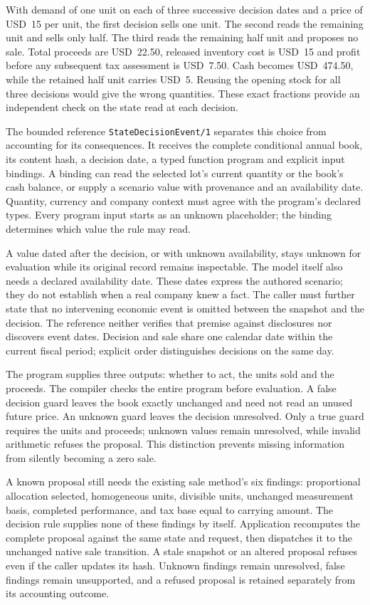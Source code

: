With demand of one unit on each of three successive decision dates and a price
of USD~15 per unit, the first decision sells one unit. The second reads the
remaining unit and sells only half. The third reads the remaining half unit
and proposes no sale. Total proceeds are USD~22.50, released inventory cost is
USD~15 and profit before any subsequent tax assessment is USD~7.50. Cash becomes
USD~474.50, while the retained half unit carries USD~5. Reusing the opening stock
for all three decisions would give the wrong quantities. These exact fractions
provide an independent check on the state read at each decision.

The bounded reference \texttt{StateDecisionEvent/1} separates this choice from
accounting for its consequences. It receives the complete conditional annual
book, its content hash, a decision date, a typed function program and explicit
input bindings. A binding can read the selected lot's current quantity or the
book's cash balance, or supply a scenario value with provenance and an
availability date. Quantity, currency and company context must agree with the
program's declared types. Every program input starts as an unknown placeholder;
the binding determines which value the rule may read.

A value dated after the decision, or with unknown availability, stays unknown
for evaluation while its original record remains inspectable. The model itself
also needs a declared availability date. These dates express the authored
scenario; they do not establish when a real company knew a fact. The caller
must further state that no intervening economic event is omitted between the
snapshot and the decision. The reference neither verifies that premise against
disclosures nor discovers event dates. Decision and sale share one calendar
date within the current fiscal period; explicit order distinguishes decisions
on the same day.

The program supplies three outputs: whether to act, the units sold and the
proceeds. The compiler checks the entire program before evaluation. A false
decision guard leaves the book exactly unchanged and need not read an unused
future price. An unknown guard leaves the decision unresolved. Only a true
guard requires the units and proceeds; unknown values remain unresolved, while
invalid arithmetic refuses the proposal. This distinction prevents missing
information from silently becoming a zero sale.

A known proposal still needs the existing sale method's six findings:
proportional allocation selected, homogeneous units, divisible units, unchanged
measurement basis, completed performance, and tax base equal to carrying amount.
The decision rule supplies none of these findings by itself. Application
recomputes the complete proposal against the same state and request, then
dispatches it to the unchanged native sale transition. A stale snapshot or an
altered proposal refuses even if the caller updates its hash. Unknown findings
remain unresolved, false findings remain unsupported, and a refused proposal
is retained separately from its accounting outcome.

